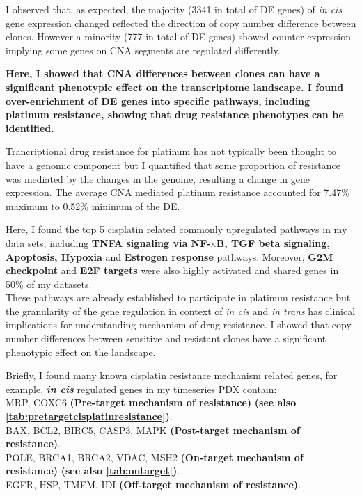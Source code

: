 I observed that, as expected, the majority (3341 in total of DE genes) of \textit{in cis} gene expression changed reflected the direction of copy number difference between clones. However a minority (777 in total of DE genes) showed counter expression implying some genes on CNA segments are regulated differently. 

\textbf{Here, I showed that CNA differences between clones can have a significant phenotypic effect on the transcriptome landscape.
I found over-enrichment of DE genes into specific pathways, including platinum resistance, showing that drug resistance phenotypes can be identified. } 


 
Trancriptional drug resistance for platinum has not typically been thought to have a genomic component but I quantified that some proportion of resistance was mediated by the changes in the genome, resulting a change in gene expression. The average CNA mediated platinum resistance accounted for 7.47\% maximum to 0.52\% minimum of the DE. 


Here, I found the top 5 cisplatin related commonly upregulated pathways in my data sets, including \textbf{TNFA signaling via NF-$\kappa$B, TGF  beta  signaling, Apoptosis, Hypoxia} and \textbf{Estrogen response} pathways. Moreover, \textbf{G2M checkpoint} and \textbf{E2F targets} were also highly activated and shared genes in 50\% of my datasets. 
\\
These pathways are already established to participate in platinum resistance but the granularity of the gene regulation in context of \textit{in cis} and \textit{in trans} has clinical implications for understanding mechanism of drug resistance. I showed that copy number differences between sensitive and resistant clones have a significant phenotypic effect on the landscape. 

Briefly, I found many known cisplatin resistance mechanism related genes, for example, \textbf{\textit{in cis}} regulated genes in my timeseries PDX  contain:
\\
MRP, COXC6  \textbf{(Pre-target mechanism of resistance)} \textbf{(see also \autoref{tab:pretargetcisplatinresistance})}.
\\
BAX, BCL2, BIRC5, CASP3, MAPK  \textbf{(Post-target mechanism of resistance)}.
\\
POLE, BRCA1, BRCA2, VDAC, MSH2 \textbf{(On-target mechanism of resistance)} \textbf{(see also \autoref{tab:ontarget})}.
\\
EGFR, HSP, TMEM, IDI \textbf{(Off-target mechanism of resistance)}.

